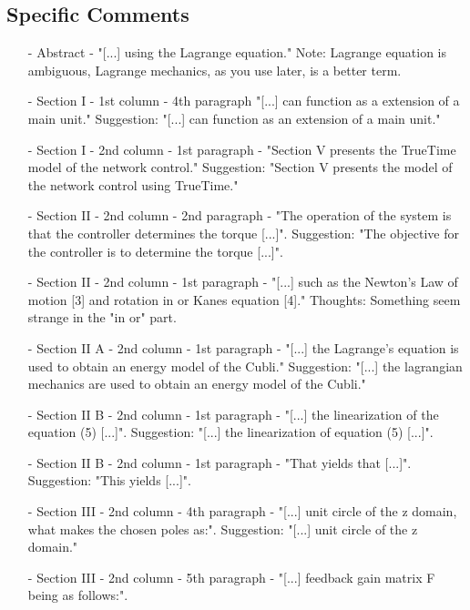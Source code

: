 \subsection{Specific Comments}
\begin{itemize}
	\item[-]Abstract - "[...] using the Lagrange equation."
Note: Lagrange equation is ambiguous, Lagrange mechanics, as you use later, is a better term.\\
	\item[-]Section I - 1st column - 4th paragraph "[...] can function as a extension of a main unit."
Suggestion: "[...] can function as an extension of a main unit."\\	
	\item[-]Section I - 2nd column - 1st paragraph - "Section V presents the TrueTime model of the network control."
Suggestion: "Section V presents the model of the network control using TrueTime."
\\
\item[-]Section II - 2nd column - 2nd paragraph - "The operation of the system is that the controller determines the torque [...]".
Suggestion: "The objective for the controller is to determine the torque [...]".
\\
\item[-]Section II - 2nd column - 1st paragraph - "[...] such as the Newton's Law of motion [3] and rotation in or Kanes equation [4]."
Thoughts: Something seem strange in the "in or" part. 
\\				
\item[-]Section II A - 2nd column - 1st paragraph - "[...] the Lagrange's equation is used to obtain an energy model of the Cubli."
Suggestion: "[...] the lagrangian mechanics are used to obtain an energy model of the Cubli." \\
\item[-]Section II B - 2nd column - 1st paragraph - "[...] the linearization of the equation (5) [...]".
Suggestion: "[...] the linearization of equation (5) [...]".\\
\item[-]Section II B - 2nd column - 1st paragraph - "That yields that [...]".
Suggestion: "This yields [...]".\\	
\item[-]Section III - 2nd column - 4th paragraph - "[...] unit circle of the z domain, what makes the chosen poles as:".
Suggestion: "[...] unit circle of the z domain."\\			
\item[-]Section III - 2nd column - 5th paragraph - "[...] feedback gain matrix F being as follows:".

\end{itemize}
